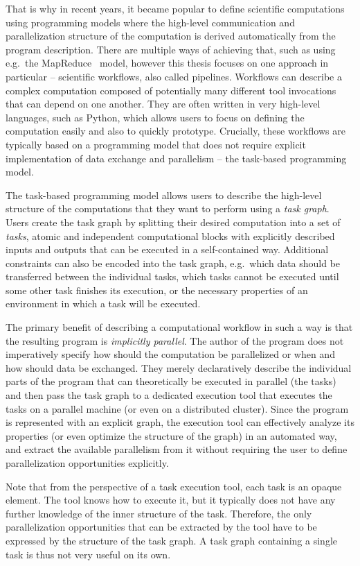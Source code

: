 That is why in recent years, it became popular to define scientific computations using programming
models where the high-level communication and parallelization structure of the computation is
derived automatically from the program description. There are multiple ways of achieving that, such
as using e.g.\ the MapReduce~\cite{mapreduce} model, however this thesis focuses on one
approach in particular -- scientific workflows, also called pipelines. Workflows can describe a
complex computation composed of potentially many different tool invocations that can depend on one
another. They are often written in very high-level languages, such as Python, which allows users to
focus on defining the computation easily and also to quickly prototype. Crucially, these workflows
are typically based on a programming model that does not require explicit implementation of data
exchange and parallelism -- the task-based programming model.

The task-based programming model allows users to describe the high-level structure of the
computations that they want to perform using a \emph{task graph}. Users create the task graph
by splitting their desired computation into a set of \emph{tasks}, atomic and independent
computational blocks with explicitly described inputs and outputs that can be executed in a
self-contained way. Additional constraints can also be encoded into the task graph, e.g.\ which
data should be transferred between the individual tasks, which tasks cannot be executed until some
other task finishes its execution, or the necessary properties of an environment in which a task
will be executed.

The primary benefit of describing a computational workflow in such a way is that the resulting
program is \emph{implicitly parallel}. The author of the program does not imperatively specify how
should the computation be parallelized or when and how should data be exchanged. They merely
declaratively describe the individual parts of the program that can theoretically be executed in
parallel (the tasks) and then pass the task graph to a dedicated execution tool that executes the
tasks on a parallel machine (or even on a distributed cluster). Since the program is represented
with an explicit graph, the execution tool can effectively analyze its properties (or even optimize
the structure of the graph) in an automated way, and extract the available parallelism from it
without requiring the user to define parallelization opportunities explicitly.

Note that from the perspective of a task execution tool, each task is an opaque element. The tool
knows how to execute it, but it typically does not have any further knowledge of the inner
structure of the task. Therefore, the only parallelization opportunities that can be extracted by
the tool have to be expressed by the structure of the task graph. A task graph containing a single
task is thus not very useful on its own.

